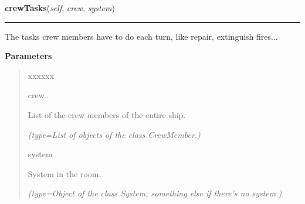 \hspace{.8\funcindent}\begin{boxedminipage}{\funcwidth}

    \raggedright \textbf{crewTasks}(\textit{self}, \textit{crew}, \textit{system})

    \vspace{-1.5ex}

    \rule{\textwidth}{0.5\fboxrule}
\setlength{\parskip}{2ex}
    The tasks crew members have to do each turn, like repair, extinguish 
    fires...

\setlength{\parskip}{1ex}
      \textbf{Parameters}
      \vspace{-1ex}

      \begin{quote}
        \begin{Ventry}{xxxxxx}

          \item[crew]

          List of the crew members of the entire ship.

            {\it (type=List of objects of the class CrewMember.)}

          \item[system]

          System in the room.

            {\it (type=Object of the class System, something else if there's no system.)}

        \end{Ventry}

      \end{quote}

    \end{boxedminipage}

    \label{room:Room:dotsToCrew}

    \vspace{0.5ex}

